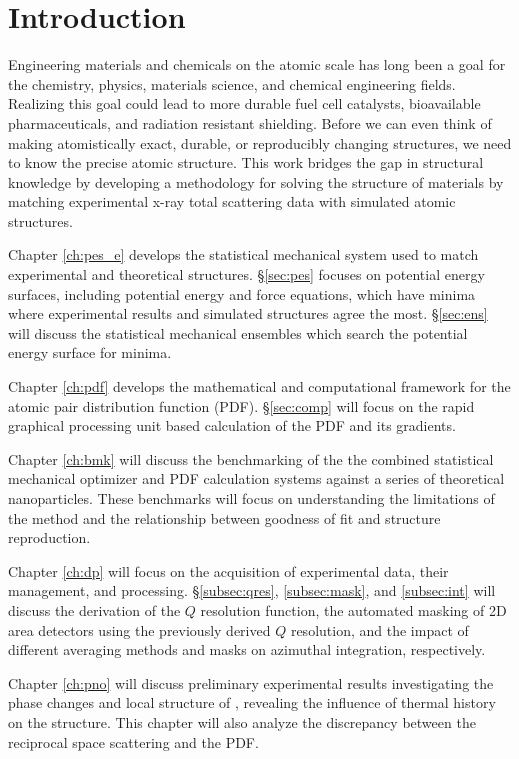 \chapter{Introduction} \label{intro}
Engineering materials and chemicals on the atomic scale has long been a goal for the chemistry, physics, materials science, and chemical engineering fields.
Realizing this goal could lead to more durable fuel cell catalysts, bioavailable pharmaceuticals, and radiation  resistant shielding.
Before we can even think of making atomistically exact, durable, or reproducibly changing structures, we need to know the precise atomic structure.
This work bridges the gap in structural knowledge by developing a methodology for solving the structure of materials by matching experimental x-ray total scattering data with simulated atomic structures.

Chapter \ref{ch:pes_e} develops the statistical mechanical system used to match experimental and theoretical structures.
\S \ref{sec:pes} focuses on potential energy surfaces, including potential energy and force equations, which have minima where experimental results and simulated structures agree the most.
\S \ref{sec:ens} will discuss the statistical mechanical ensembles which search the potential energy surface for minima.

Chapter \ref{ch:pdf} develops the mathematical and computational framework for the atomic pair distribution function (PDF).
\S \ref{sec:comp} will focus on the rapid graphical processing unit based calculation of the PDF and its gradients.

Chapter \ref{ch:bmk} will discuss the benchmarking of the the combined statistical mechanical optimizer and PDF calculation systems against a series of theoretical nanoparticles.
These benchmarks will focus on understanding the limitations of the method and the relationship between goodness of fit and structure reproduction.

Chapter \ref{ch:dp} will focus on the acquisition of experimental data, their management, and processing.
\S \ref{subsec:qres}, \ref{subsec:mask}, and \ref{subsec:int} will discuss the derivation of the $Q$ resolution function, the automated masking of 2D area detectors using the previously derived $Q$ resolution, and the impact of different averaging methods and masks on azimuthal integration, respectively.

Chapter \ref{ch:pno} will discuss preliminary experimental results investigating the phase changes and local structure of , revealing the influence of thermal history on the structure.
This chapter will also analyze the discrepancy between the reciprocal space scattering and the PDF.